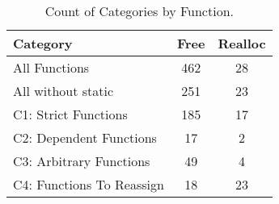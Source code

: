 \begin{table}[H]
   \begin{center}
   \begin{tabularx}{0.6\linewidth}{l|c|c}

      Category & Free & Realloc \\
      \hline

      All Functions& 462 & 28 \\

      All without static& 251 & 23 \\

      C1: Strict Functions& 185 & 17 \\

      C2: Dependent Functions& 17 & 2 \\

      C3: Arbitrary Functions& 49 & 4 \\

      C4: Functions To Reassign& 18 & 23 \\

   \end{tabularx}
\end{center}
   \caption{Count of Categories by Function.}
   \label{tab:categories:overview}
\end{table}


